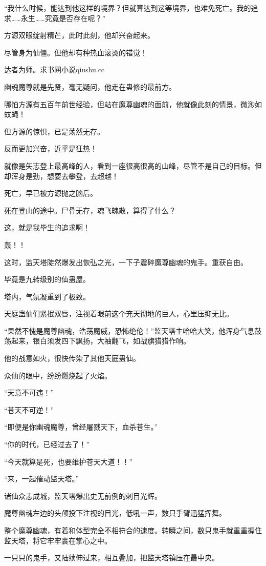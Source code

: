 \begin{this_body}
“我什么时候，能达到他这样的境界？但就算达到这等境界，也难免死亡。我的追求……永生……究竟是否存在呢？”

方源双眼绽射精芒，此时此刻，他却兴奋起来。

尽管身为仙僵。但他却有种热血滚烫的错觉！

达者为师。求书网小说qiushu.cc

幽魂魔尊就是先贤，毫无疑问，他走在蛊修的最前方。

哪怕方源有五百年前世经验，但站在魔尊幽魂的面前，他就像此刻的情景，微渺如蚊蝇！

但方源的惊惧，已是荡然无存。

反而更加兴奋，近乎是狂热！

就像是矢志登上最高峰的人，看到一座很高很高的山峰，尽管不是自己的目标。但却浑身是劲，想要去攀登，去超越！

死亡，早已被方源抛之脑后。

死在登山的途中。尸骨无存，魂飞魄散，算得了什么？

这，就是我毕生的追求啊！

轰！！

这时，监天塔陡然爆发出恢弘之光，一下子震碎魔尊幽魂的鬼手。重获自由。

毕竟是九转级别的仙蛊屋。

塔内，气氛凝重到了极致。

天庭蛊仙们紧抿双唇，注视着眼前这个充天彻地的巨人，心里压抑无比。

“果然不愧是魔尊幽魂，浩荡魔威，恐怖绝伦！”监天塔主哈哈大笑，他浑身气息鼓荡起来，银白须发四下飘扬，大袖翻飞，如战旗猎猎作响。

他的战意如火，很快传染了其他天庭蛊仙。

众仙的眼中，纷纷燃烧起了火焰。

“天意不可违！”

“苍天不可逆！”

“即便是你幽魂魔尊，曾经屠戮天下，血杀苍生。”

“你的时代，已经过去了！”

“今天就算是死，也要维护苍天大道！！”

“来，一起催动监天塔。”

诸仙众志成城，监天塔爆出史无前例的刺目光辉。

魔尊幽魂左边的头颅投下注视的目光，低吼一声，数只手臂迅猛挥舞。

整个魔尊幽魂，有着和体型完全不相符合的速度。转瞬之间，数只鬼手就重重握住监天塔，将它牢牢裹在掌心之中。

一只只的鬼手，又陆续伸过来，相互叠加，把监天塔镇压在最中央。


\end{this_body}
